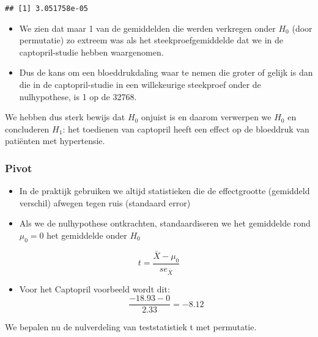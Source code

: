 \documentclass[
  12pt,dutch,coursenotes]{book}
\newenvironment{Shaded}{\begin{snugshade}}{\end{snugshade}}
\newcommand{\KeywordTok}[1]{\textcolor[rgb]{0.13,0.29,0.53}{\textbf{#1}}}
\newcommand{\NormalTok}[1]{#1}
\newcommand{\OperatorTok}[1]{\textcolor[rgb]{0.81,0.36,0.00}{\textbf{#1}}}
\newcommand{\StringTok}[1]{\textcolor[rgb]{0.31,0.60,0.02}{#1}}
\providecommand{\tightlist}{%
  \setlength{\itemsep}{0pt}\setlength{\parskip}{0pt}}
\theoremstyle{definition}
\theoremstyle{definition}
\theoremstyle{definition}
\theoremstyle{remark}
\begin{document}
\begin{Shaded}
\end{Shaded}

\begin{verbatim}
## [1] 3.051758e-05
\end{verbatim}

\begin{itemize}
\item
  We zien dat maar 1 van de gemiddelden die werden verkregen onder \(H_0\) (door permutatie) zo extreem was als het steekproefgemiddelde dat we in de captopril-studie hebben waargenomen.
\item
  Dus de kans om een bloeddrukdaling waar te nemen die groter of gelijk is dan die in de captopril-studie in een willekeurige steekproef onder de nulhypothese, is 1 op de 32768.
\end{itemize}

We hebben dus sterk bewijs dat \(H_0\) onjuist is en daarom verwerpen we \(H_0\) en concluderen \(H_1\): het toedienen van captopril heeft een effect op de bloeddruk van patiënten met hypertensie.

\hypertarget{pivot}{%
\subsubsection{Pivot}\label{pivot}}

\begin{itemize}
\item
  In de praktijk gebruiken we altijd statistieken die de effectgrootte (gemiddeld verschil) afwegen tegen ruis (standaard error)
\item
  Als we de nulhypothese ontkrachten, standaardiseren we het gemiddelde rond \(\mu_0 = 0\) het gemiddelde onder \(H_0\)
\end{itemize}

\[t=\frac{\bar X-\mu_0}{se_{\bar X}}\]

\begin{itemize}
\tightlist
\item
  Voor het Captopril voorbeeld wordt dit:
  \[\frac{-18.93-0}{2.33}=-8.12\]
\end{itemize}

We bepalen nu de nulverdeling van teststatistiek t met permutatie.
\end{document}
